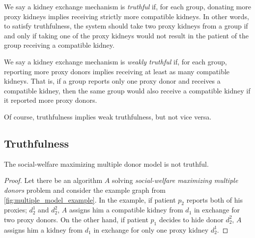 \begin{definition}[Truthfulness]
We say a kidney exchange mechanism is \emph{truthful} if, for each group, donating more proxy kidneys implies receiving strictly more compatible kidneys. In other words, to satisfy truthfulness, the system should take two proxy kidneys from a group if and only if taking one of the proxy kidneys would not result in the patient of the group receiving a compatible kidney.
\end{definition}

\begin{definition}
We say a kidney exchange mechanism is \emph{weakly truthful} if, for each group, reporting more proxy donors implies receiving at least as many compatible kidneys. That is, if a group reports only one proxy donor and receives a compatible kidney, then the same group would also receive a compatible kidney if it reported more proxy donors.
\end{definition}

Of course, truthfulness implies weak truthfulness, but not vice versa.

\subsection{Truthfulness}
\begin{lemma}
    \label{lemma:social_walfare_not_strongly_truthful}
    The social-welfare maximizing multiple donor model is not truthful.
    \begin{proof}
        Let there be an algorithm $A$ solving \textit{social-welfare maximizing multiple donors} problem and consider the example graph from \autoref{fig:multiple_model_example}. In the example, if patient $p_2$ reports both of his proxies; $d_2^1$ and $d_2^2$, $A$ assigns him a compatible kidney from $d_1$ in exchange for two proxy donors. On the other hand, if patient $p_1$ decides to hide donor $d_2^2$, $A$ assigns him a kidney from $d_1$ in exchange for only one proxy kidney $d_2^1$.
    \end{proof}
\end{lemma}


